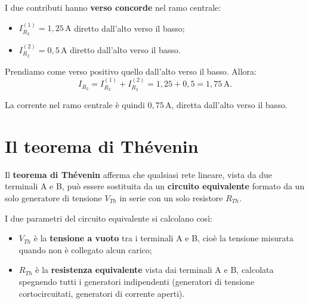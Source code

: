 \begin{esempio}
I due contributi hanno \textbf{verso concorde} nel ramo centrale:
\begin{itemize}[leftmargin=1cm]
  \item \(I_{R_2}^{(1)} = 1{,}25\,\text{A}\) diretto dall'alto verso il basso;
  \item \(I_{R_2}^{(2)} = 0{,}5\,\text{A}\) diretto dall'alto verso il basso.
\end{itemize}

Prendiamo come verso positivo quello dall'alto verso il basso. Allora:
\[
I_{R_2} = I_{R_2}^{(1)} + I_{R_2}^{(2)} = 1{,}25 + 0{,}5 = 1{,}75\,\text{A}.
\]

La corrente nel ramo centrale è quindi \(0{,}75\,\text{A}\), diretta dall'alto verso il basso.

\end{esempio}




















\section{Il teorema di Thévenin}

\begin{concetto}
Il \textbf{teorema di Thévenin} afferma che qualsiasi rete lineare, vista da due terminali A e B, può essere sostituita da un \textbf{circuito equivalente} formato da un solo generatore di tensione \(V_{Th}\) in serie con un solo resistore \(R_{Th}\).
\end{concetto}

I due parametri del circuito equivalente si calcolano così:
\begin{itemize}[leftmargin=1cm]
  \item \(V_{Th}\) è la \textbf{tensione a vuoto} tra i terminali A e B, cioè la tensione misurata quando non è collegato alcun carico;
  \item \(R_{Th}\) è la \textbf{resistenza equivalente} vista dai terminali A e B, calcolata spegnendo tutti i generatori indipendenti (generatori di tensione cortocircuitati, generatori di corrente aperti).
\end{itemize}

